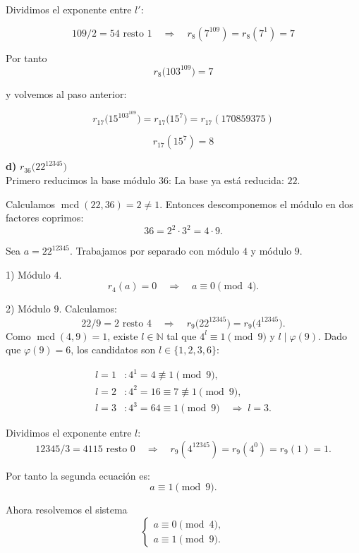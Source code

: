 \documentclass[a4paper,12pt]{article}
\begin{document}
\begin{ejercicio}[title=Ejercicio 28]

Dividimos el exponente entre $l'$:

\[
109 / 2 = 54 \text{ resto } 1 \quad \Rightarrow \quad r_{8}(7^{109}) = r_{8}(7^1) = 7
\]

Por tanto
\[
r_{8}\bigl(103^{109}\bigr) = 7
\]

y volvemos al paso anterior:

\[
r_{17}\bigl(15^{103^{109}}\bigr) = r_{17}\bigl(15^{7}\bigr) = r_{17}(170859375)
\]

\[
r_{17}(15^7) = \boxed{8}
\]

\textbf{d)} $r_{36}\bigl(22^{12345}\bigr)$ \\

Primero reducimos la base módulo 36:  
La base ya está reducida: \(22\).

Calculamos $\operatorname{mcd}(22,36)=2\neq 1$. Entonces descomponemos el módulo en dos factores coprimos:
\[
36 = 2^2\cdot 3^2 = 4\cdot 9.
\]

Sea \(a=22^{12345}\). Trabajamos por separado con módulo \(4\) y módulo \(9\).

\vspace{0.5em}

1) Módulo \(4\).
\[
r_{4}(a)=0 \quad\Rightarrow\quad a\equiv 0 \pmod{4}.
\]

2) Módulo \(9\). Calculamos:
\[
22 / 9 = 2 \text{ resto } 4 \quad\Rightarrow\quad r_{9}\bigl(22^{12345}\bigr)=r_{9}\bigl(4^{12345}\bigr).
\]
Como $\operatorname{mcd}(4,9)=1$, existe \(l\in\mathbb{N}\) tal que \(4^l\equiv 1\pmod{9}\) y \(l\mid\varphi(9)\).  
Dado que \(\varphi(9)=6\), los candidatos son \(l\in\{1,2,3,6\}\):

\[
\begin{aligned}
l=1 &: 4^1=4\not\equiv 1\pmod{9},\\
l=2 &: 4^2=16\equiv 7\not\equiv 1\pmod{9},\\
l=3 &: 4^3=64\equiv 1\pmod{9}\quad\Rightarrow\; l=3.
\end{aligned}
\]

Dividimos el exponente entre \(l\):
\[
12345 / 3 = 4115 \text{ resto } 0 \quad\Rightarrow\quad r_{9}(4^{12345}) = r_{9}(4^0)=r_{9}(1)=1.
\]

Por tanto la segunda ecuación es:
\[
a\equiv 1 \pmod{9}.
\]

Ahora resolvemos el sistema
\[
\begin{cases}
a\equiv 0 \pmod{4},\\[4pt]
a\equiv 1 \pmod{9}.
\end{cases}
\]

\end{ejercicio}
\end{document}
